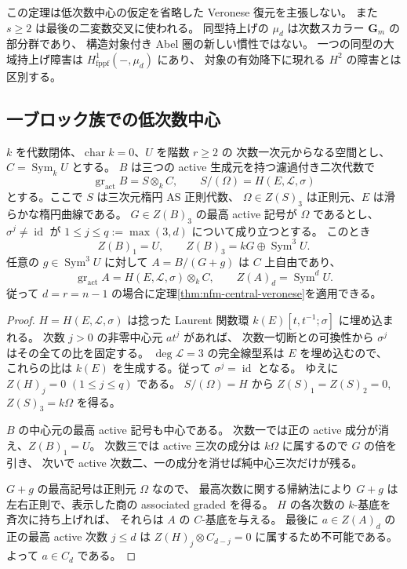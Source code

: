 \begin{remark}
この定理は低次数中心の仮定を省略した Veronese 復元を主張しない。
また $s\geq2$ は最後の二変数交叉に使われる。
同型持上げの $\mu_d$ は次数スカラー $\mathbf G_m$ の部分群であり、
構造対象付き Abel 圏の新しい慣性ではない。
一つの同型の大域持上げ障害は $H^1_{\mathrm{fppf}}(-,\mu_d)$ にあり、
対象の有効降下に現れる $H^2$ の障害とは区別する。
\end{remark}

\subsection{一ブロック族での低次数中心}

\begin{proposition}[有限個の楕円位数条件]
\label{prop:nfm-center-bound}
$k$ を代数閉体、$\operatorname{char}k=0$、$U$ を階数 $r\geq2$ の
次数一次元からなる空間とし、$C=\operatorname{Sym}_kU$ とする。
$B$ は三つの active 生成元を持つ濾過付き二次代数で
\[
 \operatorname{gr}_{\mathrm{act}}B=S\otimes_k C,
 \qquad S/(\Omega)=H(E,\mathcal L,\sigma)
\]
とする。ここで $S$ は三次元楕円 AS 正則代数、
$\Omega\in Z(S)_3$ は正則元、$E$ は滑らかな楕円曲線である。
$G\in Z(B)_3$ の最高 active 記号が $\Omega$ であるとし、
$\sigma^j\ne\operatorname{id}$ が
$1\leq j\leq q:=\max(3,d)$ について成り立つとする。
このとき
\[
 Z(B)_1=U,\qquad Z(B)_3=kG\oplus\operatorname{Sym}^3U.
\]
任意の $g\in\operatorname{Sym}^3U$ に対して
$A=B/(G+g)$ は $C$ 上自由であり、
\[
 \operatorname{gr}_{\mathrm{act}}A=H(E,\mathcal L,\sigma)\otimes_k C,
 \qquad Z(A)_d=\operatorname{Sym}^dU.
\]
従って $d=r=n-1$ の場合に定理\ref{thm:nfm-central-veronese}を適用できる。
\end{proposition}

\begin{proof}
$H=H(E,\mathcal L,\sigma)$ は捻った Laurent 関数環
$k(E)[t,t^{-1};\sigma]$ に埋め込まれる。
次数 $j>0$ の非零中心元 $a t^j$ があれば、
次数一切断との可換性から $\sigma^j$ はその全ての比を固定する。
$\deg\mathcal L=3$ の完全線型系は $E$ を埋め込むので、
これらの比は $k(E)$ を生成する。従って $\sigma^j=\operatorname{id}$ となる。
ゆえに $Z(H)_j=0$ $(1\leq j\leq q)$ である。
$S/(\Omega)=H$ から
$Z(S)_1=Z(S)_2=0$, $Z(S)_3=k\Omega$ を得る。

$B$ の中心元の最高 active 記号も中心である。
次数一では正の active 成分が消え、$Z(B)_1=U$。
次数三では active 三次の成分は $k\Omega$ に属するので $G$ の倍を引き、
次いで active 次数二、一の成分を消せば純中心三次だけが残る。

$G+g$ の最高記号は正則元 $\Omega$ なので、
最高次数に関する帰納法により $G+g$ は左右正則で、表示した商の associated graded を得る。
$H$ の各次数の $k$-基底を斉次に持ち上げれば、
それらは $A$ の $C$-基底を与える。
最後に $a\in Z(A)_d$ の正の最高 active 次数 $j\leq d$ は
$Z(H)_j\otimes C_{d-j}=0$ に属するため不可能である。
よって $a\in C_d$ である。
\end{proof}

